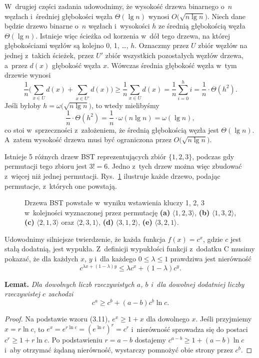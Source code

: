 W~drugiej części zadania udowodnimy, że wysokość drzewa binarnego o~$n$ węzłach i~średniej głębokości węzła $\Theta(\lg n)$ wynosi $O\bigl(\!\sqrt{n\lg n}\bigr)$.
Niech dane będzie drzewo binarne o~$n$ węzłach i~wysokości $h$ ze średnią głębokością węzła $\Theta(\lg n)$.
Istnieje więc ścieżka od korzenia w~dół tego drzewa, na której głębokościami węzłów są kolejno 0, 1, \dots, $h$.
Oznaczmy przez $U$ zbiór węzłów na jednej z~takich ścieżek, przez $U'$ zbiór wszystkich pozostałych węzłów drzewa, a~przez $d(x)$ głębokość węzła $x$.
Wówczas średnia głębokość węzła w~tym drzewie wynosi
\[
	\frac{1}{n}\biggl(\sum_{x\in U}d(x)+\sum_{x\in U'}d(x)\biggr) \ge \frac{1}{n}\sum_{x\in U}d(x) = \frac{1}{n}\sum_{i=0}^hi = \frac{1}{n}\cdot\Theta(h^2).
\]
Jeśli byłoby $h=\omega\bigl(\!\sqrt{n\lg n}\bigr)$, to wtedy mielibyśmy
\[
	\frac{1}{n}\cdot\Theta(h^2) = \frac{1}{n}\cdot\omega(n\lg n) = \omega(\lg n),
\]
co stoi w~sprzeczności z~założeniem, że średnią głębokością węzła jest $\Theta(\lg n)$.
A~zatem wysokość drzewa musi być ograniczona przez $O\bigl(\!\sqrt{n\lg n}\bigr)$.

\exercise %
Istnieje 5 różnych drzew BST reprezentujących zbiór $\{1,2,3\}$, podczas gdy permutacji tego zbioru jest $3!=6$.
Jedno z~tych drzew można więc zbudować z~więcej niż jednej permutacji.
Rys.~\ref{fig:12.4-3} ilustruje każde drzewo, podając permutacje, z~których one powstają.
\begin{figure}[!ht]
	\centering 
	\caption{Drzewa BST powstałe w~wyniku wstawienia kluczy 1, 2, 3 w~kolejności wyznaczonej przez permutację {\sffamily\bfseries(a)} $\langle1,2,3\rangle$,
{\sffamily\bfseries(b)} $\langle1,3,2\rangle$,
{\sffamily\bfseries(c)} $\langle2,1,3\rangle$ oraz $\langle2,3,1\rangle$, {\sffamily\bfseries(d)} $\langle3,1,2\rangle$, {\sffamily\bfseries(e)} $\langle3,2,1\rangle$.} \label{fig:12.4-3}
\end{figure}

\exercise %
Udowodnimy silniejsze twierdzenie, że każda funkcja $f(x)=c^x$, gdzie $c$ jest stałą dodatnią, jest wypukła.
Z~definicji wypukłości funkcji z~dodatku C musimy pokazać, że dla każdych $x$, $y$ i~dla każdego $0\le\lambda\le1$ prawdziwa jest nierówność
\[
	c^{\lambda x+(1-\lambda)y} \le \lambda c^x+(1-\lambda)c^y.
\]

\medskip
\noindent\textsf{\textbf{Lemat.}} \textit{Dla dowolnych liczb rzeczywistych\/ $a$,\/ $b$ i~dla dowolnej dodatniej liczby rzeczywistej\/ $c$ zachodzi
\[
	c^a \ge c^b+(a-b)c^b\ln c.
\]
}
\begin{proof}
Na podstawie wzoru (3.11), $e^x\ge1+x$ dla dowolnego $x$.
Jeśli przyjmiemy $x=r\ln c$, to $e^x=e^{r\ln c}=(e^{\ln c})^r=c^r$ i~nierówność sprowadza się do postaci $c^r\ge1+r\ln c$.
Po podstawieniu $r=a-b$ dostajemy $c^{a-b}\ge1+(a-b)\ln c$ i~aby otrzymać żądaną nierówność, wystarczy pomnożyć obie strony przez $c^b$.
\end{proof}

